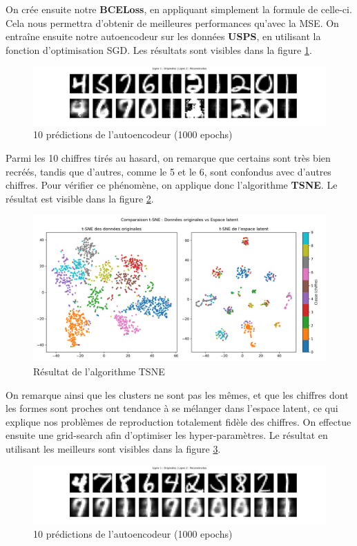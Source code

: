 \documentclass{article}
\begin{document}
On crée ensuite notre \textbf{BCELoss}, en appliquant simplement la formule de celle-ci. Cela nous permettra d'obtenir de meilleures performances qu'avec la MSE.
On entraîne ensuite notre autoencodeur sur les données \textbf{USPS}, en utilisant la fonction d'optimisation SGD.
Les résultats sont visibles dans la figure \ref{fig:autoecodeur}.
\begin{figure}[H]
    \centering
    \includegraphics[width=1\linewidth]{Images/autoecodeur.png}
    \caption{10 prédictions de l'autoencodeur (1000 epochs)}
    \label{fig:autoecodeur}
\end{figure}
Parmi les 10 chiffres tirés au hasard, on remarque que certains sont très bien recréés, tandis que d'autres, comme le 5 et le 6, sont confondus avec d'autres chiffres.  Pour vérifier ce phénomène, on applique donc l'algorithme \textbf{TSNE}. Le résultat est visible dans la figure \ref{fig:tsne}.
\begin{figure}[H]
    \centering
    \includegraphics[width=0.8\linewidth]{Images/t-sne.png}
    \caption{Résultat de l'algorithme TSNE}
    \label{fig:tsne}
\end{figure}
On remarque ainsi que les clusters ne sont pas les mêmes, et que les chiffres dont les formes sont proches ont tendance à se mélanger dans l'espace latent, ce qui explique nos problèmes de reproduction totalement fidèle des chiffres.
On effectue ensuite une grid-search afin d'optimiser les hyper-paramètres. Le résultat en utilisant les meilleurs sont visibles dans la figure \ref{fig:autoecodeur_grid}.
\begin{figure}[H]
    \centering
    \includegraphics[width=1\linewidth]{Images/autoecodeur_grid.png}
    \caption{10 prédictions de l'autoencodeur (1000 epochs)}
    \label{fig:autoecodeur_grid}
\end{figure}
\end{document}

